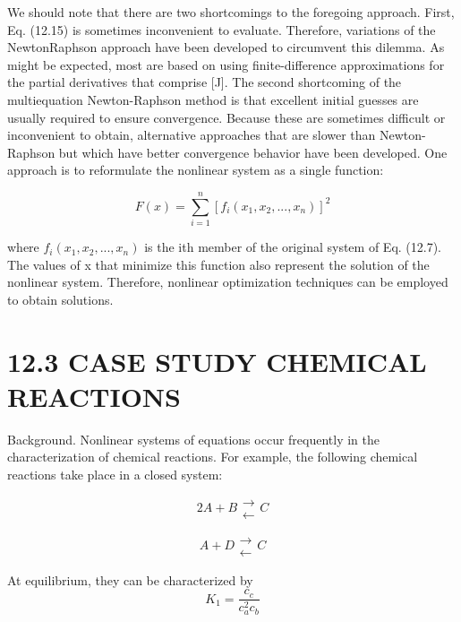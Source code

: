 \documentclass[../main.tex]{subfiles}
\begin{document}
We should note that there are two shortcomings to the foregoing approach. First,
Eq. (12.15) is sometimes inconvenient to evaluate. Therefore, variations of the NewtonRaphson approach have been developed to circumvent this dilemma. As might be expected, most are based on using finite-difference approximations for the partial derivatives
that comprise [J]. The second shortcoming of the multiequation Newton-Raphson method
is that excellent initial guesses are usually required to ensure convergence. Because these
are sometimes difficult or inconvenient to obtain, alternative approaches that are slower
than Newton-Raphson but which have better convergence behavior have been developed.
One approach is to reformulate the nonlinear system as a single function:

\begin{equation}
F(x)=\sum_{i=1}^{n}[f_{i}(x_{1}, x_{2},...,x_{n})]^{2}
\end{equation}

where $f_{i}(x_{1}, x_{2}, ..., x_{n})$ is the ith member of the original system of Eq. (12.7). The values
of x that minimize this function also represent the solution of the nonlinear system. Therefore, nonlinear optimization techniques can be employed to obtain solutions.

\section*{12.3 CASE STUDY CHEMICAL REACTIONS}

Background. Nonlinear systems of equations occur frequently in the characterization
of chemical reactions. For example, the following chemical reactions take place in a closed
system:

\begin{equation}
2A+B\begin{matrix}
\rightarrow \\
\leftarrow
\end{matrix}C
\tag{12.18}
\end{equation}

\begin{equation}
A+D\begin{matrix}
\rightarrow \\
\leftarrow
\end{matrix}C
\tag{12.19}
\end{equation}

At equilibrium, they can be characterized by
\begin{equation}
K_{1}=\frac{c_{c}}{c_{a}^{2}c_{b}}
\tag{12.20}
\end{equation}
\end{document}
